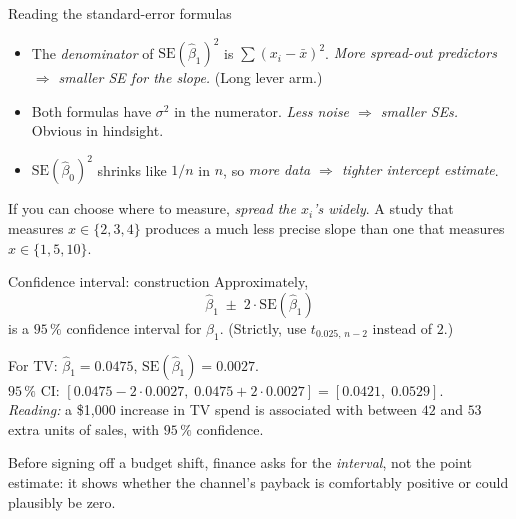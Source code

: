 \documentclass[aspectratio=169,11pt]{beamer}
\begin{document}
\begin{frame}{Reading the standard-error formulas}
  \begin{readme}
    \begin{itemize}
      \item The \emph{denominator} of $\mathrm{SE}(\hat\beta_1)^2$ is
            $\sum (x_i - \bar x)^2$. \emph{More spread-out predictors
            $\Rightarrow$ smaller SE for the slope.} (Long lever arm.)
      \item Both formulas have $\sigma^2$ in the numerator. \emph{Less
            noise $\Rightarrow$ smaller SEs.} Obvious in hindsight.
      \item $\mathrm{SE}(\hat\beta_0)^2$ shrinks like $1/n$ in $n$, so
            \emph{more data $\Rightarrow$ tighter intercept estimate}.
    \end{itemize}
  \end{readme}
  \begin{takeaway}
    If you can choose where to measure, \emph{spread the $x_i$'s widely}.
    A study that measures $x \in \{2, 3, 4\}$ produces a much less
    precise slope than one that measures $x \in \{1, 5, 10\}$.
  \end{takeaway}
\end{frame}

\begin{frame}{Confidence interval: construction}
  Approximately,
  \[
    \boxed{\;\hat\beta_1 \;\pm\; 2\cdot \mathrm{SE}(\hat\beta_1)\;}
  \]
  is a $95\,\%$ confidence interval for $\beta_1$. (Strictly, use
  $t_{0.025,\,n-2}$ instead of $2$.)
  \begin{numexample}
    For TV: $\hat\beta_1 = 0.0475$, $\mathrm{SE}(\hat\beta_1) = 0.0027$.\\
    $95\,\%$ CI: $[0.0475 - 2\cdot 0.0027,\; 0.0475 + 2\cdot 0.0027]
                 = [0.0421,\; 0.0529]$.\\
    \emph{Reading:} a \$1{,}000 increase in TV spend is associated with
    between $42$ and $53$ extra units of sales, with $95\,\%$
    confidence.
  \end{numexample}
  \begin{industry}
    Before signing off a budget shift, finance asks for the \emph{interval},
    not the point estimate: it shows whether the channel's payback is
    comfortably positive or could plausibly be zero.
  \end{industry}
\end{frame}
\end{document}
